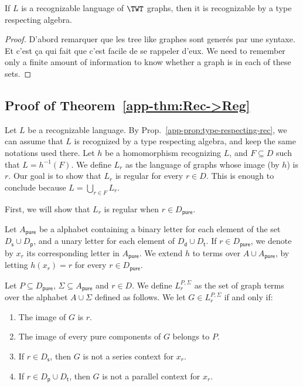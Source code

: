 \begin{lemma}\label{app-prop:type-respecting-rec}
If $L$ is a recognizable language of $\TWT$ graphs, then  it is recognizable by a type respecting algebra.
\end{lemma}

\begin{proof}
D'abord remarquer que les tree like graphes sont generés par une syntaxe. Et c'est ça qui fait que c'est facile de se rappeler d'eux.
We need to remember only a finite amount of information to know whether a graph is in each of these sets. 
\end{proof}





\subsection{Proof of Theorem~\ref{app-thm:Rec->Reg}}



Let $L$ be a recognizable language. By Prop.~\ref{app-prop:type-respecting-rec}, we can assume that $L$ is recognized by a type respecting algebra, and keep the same notations used there. Let $h$ be a homomorphism recognizing $L$, and $F\subseteq D$ such that $L=h^{-1}(F)$. We define $L_r$ as the language of graphs whose image (by $h$) is $r$. Our goal is to show that $L_r$ is regular for every $r\in D$. This is enough to conclude because 
$L=\underset{r\in F}{\bigcup}L_r$.
\medskip

First, we will show that $L_r$ is regular when \underline{$r\in D_\mathsf{pure}$}. 
\medskip

  Let $A_\mathsf{pure}$ be a alphabet containing a binary letter for each element of the set $D_\mathsf{s}\cup D_\mathsf{p}$, and a unary letter for each element of  $D_\mathsf{d}\cup D_\mathsf{t}$. If $r\in D_{\mathsf{pure}}$, we denote by $x_r$ its corresponding letter in $A_\mathsf{pure}$. We extend $h$  to terms over  $A\cup A_\mathsf{pure}$, by letting $h(x_r)=r$ for every $r\in D_\mathsf{pure}$.
\smallskip

Let $P \subseteq  D_{\mathsf{pure}}$, $\Sigma\subseteq A_\mathsf{pure}$ and $r\in D$. We define $L^{P,\Sigma}_r$ as the set of graph terms over the alphabet $A\cup \Sigma$ defined as follows. We let $G\in L^{P,\Sigma}_r$  if and only if:
\begin{enumerate}
\item The image of $G$ is $r$.
\item The image of every pure components of $G$ belongs to $P$.
\item If $r\in D_\mathsf{s}$,  then $G$ is not a series context for $x_r$.
\item If $r\in D_\mathsf{p}\cup D_\mathsf{t}$,  then $G$ is not a parallel context for $x_r$.
\end{enumerate}


